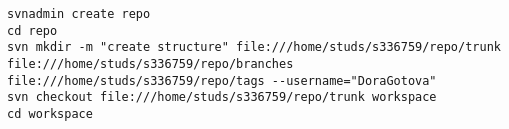 \tiny
\begin{verbatim}
svnadmin create repo
cd repo
svn mkdir -m "create structure" file:///home/studs/s336759/repo/trunk file:///home/studs/s336759/repo/branches file:///home/studs/s336759/repo/tags --username="DoraGotova"
svn checkout file:///home/studs/s336759/repo/trunk workspace
cd workspace
\end{verbatim}
\normalsize